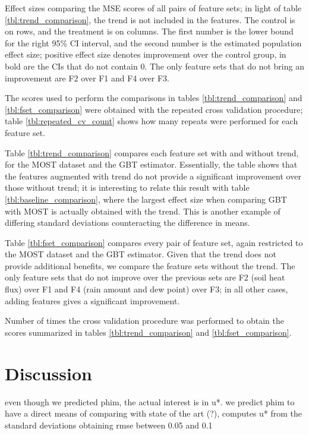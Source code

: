 \documentclass[a4paper]{book}
\begin{document}
\begin{table}[p]
\caption{Effect sizes comparing the MSE scores of all pairs of feature sets; in light of table \ref{tbl:trend_comparison}, the trend is not included in the features. The control is on rows, and the treatment is on columns. The first number is the lower bound for the right 95\% CI interval, and the second number is the estimated population effect size; positive effect size denotes improvement over the control group, in bold are the CIs that do not contain 0. The only feature sets that do not bring an improvement are F2 over F1 and F4 over F3.}
\label{tbl:fset_comparison}

\end{table}

The scores used to perform the comparisons in tables \ref{tbl:trend_comparison} and \ref{tbl:fset_comparison} were obtained with the repeated cross validation procedure; table \ref{tbl:repeated_cv_count} shows how many repeats were performed for each feature set.

Table \ref{tbl:trend_comparison} compares each feature set with and without trend, for the MOST dataset and the GBT estimator. Essentially, the table shows that the features augmented with trend do not provide a significant improvement over those without trend; it is interesting to relate this result with table \ref{tbl:baseline_comparison}, where the largest effect size when comparing GBT with MOST is actually obtained with the trend. This is another example of differing standard deviations counteracting the difference in means.

Table \ref{tbl:fset_comparison} compares every pair of feature set, again restricted to the MOST dataset and the GBT estimator. Given that the trend does not provide additional benefits, we compare the feature sets without the trend. The only feature sets that do not improve over the previous sets are F2 (soil heat flux) over F1 and F4 (rain amount and dew point) over F3; in all other cases, adding features gives a significant improvement.


\begin{table}
\caption{Number of times the cross validation procedure was performed to obtain the scores summarized in tables \ref{tbl:trend_comparison} and \ref{tbl:fset_comparison}.}
\label{tbl:repeated_cv_count}

\end{table}


\chapter{Discussion}
\label{ch:discussion}
even though we predicted phim, the actual interest is in u*. we predict phim to have a direct means of comparing with state of the art (?), \cite{weber1999} computes u* from the standard deviations obtaining rmse between 0.05 and 0.1
\end{document}
